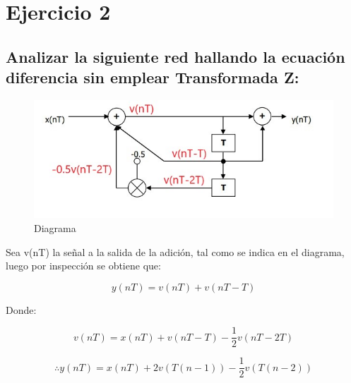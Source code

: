 \section*{Ejercicio 2}

\subsection*{Analizar la siguiente red hallando la ecuación diferencia sin emplear Transformada Z:}

\begin{figure}[H]
    \centering 
    \includegraphics [scale=0.8]{images/ej2.png} 
    \caption{Diagrama}
\end{figure}

Sea v(nT) la señal a la salida de la adición, tal como se indica en el diagrama, luego por inspección se obtiene que:

$$y(nT) = v(nT) + v(nT-T)$$

Donde:

$$v(nT) = x(nT) + v(nT-T) - \frac{1}{2}v(nT-2T)$$

$$\therefore y(nT) = x(nT) + 2v(T(n-1)) - \frac{1}{2}v(T(n-2))$$